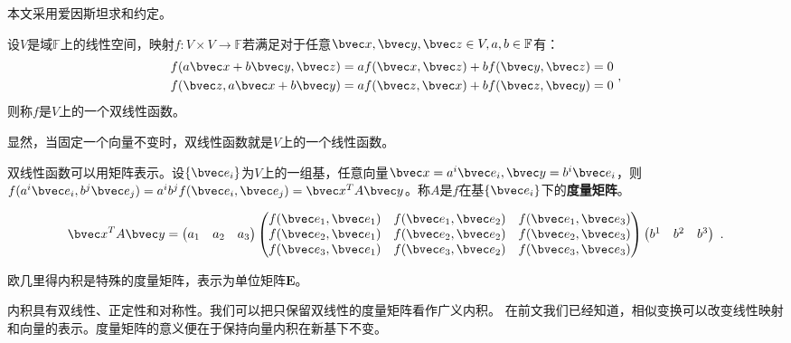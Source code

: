 本文采用爱因斯坦求和约定。

\begin{definition}{}
设$V$是域$\mathbb F$上的线性空间，映射$f:V\times V\rightarrow\mathbb F$若满足对于任意$\bvec x,\bvec y,\bvec z \in V,a,b\in \mathbb F$有：
\begin{equation}
\begin{aligned}
f(a\bvec x+b\bvec y,\bvec z)&=af(\bvec x,\bvec z)+bf(\bvec y,\bvec z)=0\\
f(\bvec z,a\bvec x+b\bvec y)&=af(\bvec z,\bvec  x)+bf(\bvec z,\bvec y)=0
\end{aligned}~,
\end{equation}
则称$f$是$V$上的一个双线性函数。
\end{definition}

显然，当固定一个向量不变时，双线性函数就是$V$上的一个线性函数。

双线性函数可以用矩阵表示。设$\{\bvec e_i\}$为$V$上的一组基，任意向量$\bvec x=a^i\bvec e_i,\bvec y=b^i\bvec e_i$，则$f(a^i\bvec e_i,b^j\bvec e_j)=a^ib^jf(\bvec e_i,\bvec e_j)=\bvec x^TA\bvec y$。称$A$是$f$在基$\{\bvec e_i\}$下的\textbf{度量矩阵}。
\begin{example}{}
\begin{equation}
\bvec x^TA\bvec y=\begin{pmatrix}
 a_1 &a_2  &a_3
\end{pmatrix}
\begin{pmatrix}
  f(\bvec e_1,\bvec e_1)& f(\bvec e_1,\bvec e_2) &f(\bvec e_1,\bvec e_3) \\
 f(\bvec e_2,\bvec e_1) &f(\bvec e_2,\bvec e_2)  &f(\bvec e_2,\bvec e_3) \\
 f(\bvec e_3,\bvec e_1) & f(\bvec e_3,\bvec e_2) &f(\bvec e_3,\bvec e_3)
\end{pmatrix}
 \begin{pmatrix}
 b^1 &b^2  &b^3
\end{pmatrix}~.
\end{equation}
\end{example}
\begin{example}{}
欧几里得内积是特殊的度量矩阵，表示为单位矩阵$\boldsymbol E$。
\end{example}
内积具有双线性、正定性和对称性。我们可以把只保留双线性的度量矩阵看作广义内积。
在前文我们已经知道，相似变换可以改变线性映射和向量的表示。度量矩阵的意义便在于保持向量内积在新基下不变。

